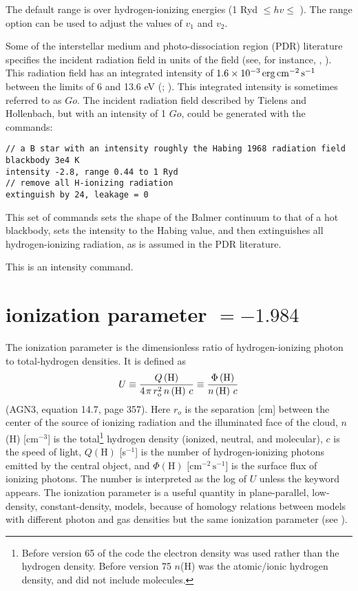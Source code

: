 The default range is over hydrogen-ionizing energies
(1 Ryd  $\le hv\le$ \egamry ).
The range option can be used to adjust
the values of $v_1$ and $v_2$.

Some of the interstellar medium and photo-dissociation region (PDR)
literature specifies the incident radiation field in units of the
\citet{Habing1968} field (see, for instance, \citealp{Tielens1985a},
\citealp{Tielens1985b}).
This
radiation field has an integrated intensity of
$1.6\times 10^{-3} \mbox{${\rm\thinspace erg}{\rm\thinspace cm}^{-2}{\rm\thinspace s}^{-1}\,$}$ between
the limits of 6 and 13.6 eV (\citealp{Tielens1985a}; \citealp{Hollenbach1991}).
This integrated intensity is sometimes referred
to as $Go$.
The incident radiation field described by Tielens and Hollenbach,
but with an
intensity of 1 $Go$, could be generated with the commands:
\begin{verbatim}
// a B star with an intensity roughly the Habing 1968 radiation field
blackbody 3e4 K
intensity -2.8, range 0.44 to 1 Ryd
// remove all H-ionizing radiation
extinguish by 24, leakage = 0
\end{verbatim}
This set of commands sets the shape of the Balmer continuum to
that of a hot blackbody, sets the intensity to the Habing value,
and then extinguishes
all hydrogen-ionizing radiation,
as is assumed in the PDR literature.

This is an intensity command.

\section{ionization parameter $= -1.984$}

The ionization parameter is the dimensionless ratio of hydrogen-ionizing
photon to total-hydrogen densities.  It is defined as
\begin{equation}
U \equiv \frac{{Q\left( {\mathrm{H}} \right)}}{{4{\kern 1pt} \pi \,r_{\mathrm{o}}^2
\,n\left( {\mathrm{H}} \right)\,c}} \equiv \frac{{\Phi \left( {\mathrm{H}}
\right)}}{{n\left( {\mathrm{H}} \right)\,c}}%
\end{equation}
(AGN3, equation 14.7, page 357).
Here $r_o$ is the separation [cm] between
the center of the source of ionizing radiation and the illuminated face
of the cloud, $n$(H) [cm$^{-3}$] is the
total\footnote{Before version 65 of the code the
electron density was used rather
than the hydrogen density.
Before version 75 $n$(H) was the atomic/ionic
hydrogen density, and did not include molecules.}
hydrogen density (ionized, neutral,
and molecular), $c$ is the speed of light,
$Q(\mathrm{H})$ [s$^{-1}$] is the number of
hydrogen-ionizing photons emitted by the central object,
and $\Phi(\mathrm{H})$
[cm$^{-2}\, \mathrm{s}^{-1}$] is the surface flux of ionizing photons.
The number is interpreted
as the log of $U$ unless the keyword  appears.
The ionization parameter
is a useful quantity in plane-parallel, low-density, constant-density,
models, because of homology relations between models with different photon
and gas densities but the same ionization parameter (see \citealp{Davidson1977}).

